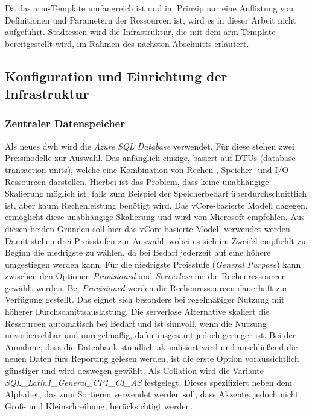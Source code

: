 Da das \ac{arm}-Template umfangreich ist und im Prinzip nur eine Auflistung von Definitionen und Parametern der Ressourcen ist, wird es in dieser Arbeit nicht aufgeführt. Stadtessen wird die Infrastruktur, die mit dem \ac{arm}-Template bereitgestellt wird, im Rahmen des nächsten Abschnitts erläutert.

\subsection{Konfiguration und Einrichtung der Infrastruktur} \label{subsec:infra:konfig}

\subsubsection{Zentraler Datenspeicher} \label{subsec:infra:konfig:datenspeicher}
Als neues \ac{dwh} wird die \textit{Azure SQL Database} verwendet. Für diese stehen zwei Preismodelle zur Auswahl. Das anfänglich einzige, basiert auf DTUs (database transaction units), welche eine Kombination von Rechen-, Speicher- und I/O Ressourcen darstellen. Hierbei ist das Problem, dass keine unabhängige Skalierung möglich ist, falls zum Beispiel der Speicherbedarf überdurchschnittlich ist, aber kaum Rechenleistung benötigt wird. Das vCore-basierte Modell dagegen, ermöglicht diese unabhängige Skalierung und wird von Microsoft empfohlen. Aus diesen beiden Gründen soll hier das vCore-basierte Modell verwendet werden. Damit stehen drei Preisstufen zur Auswahl, wobei es sich im Zweifel empfiehlt zu Beginn die niedrigste zu wählen, da bei Bedarf jederzeit auf eine höhere umgestiegen werden kann. Für die niedrigste Preisstufe (\textit{General Purpose}) kann zwischen den Optionen \textit{Provisioned} und \textit{Serverless} für die Rechenressourcen gewählt werden. Bei \textit{Provisioned} werden die Rechenressourcen dauerhaft zur Verfügung gestellt. Das eignet sich besonders bei regelmäßiger Nutzung mit höherer Durchschnittsauslastung. Die serverlose Alternative skaliert die Ressourcen automatisch bei Bedarf und ist sinnvoll, wenn die Nutzung unvorhersehbar und unregelmäßig, dafür insgesamt jedoch geringer ist. Bei der Annahme, dass die Datenbank stündlich aktualisiert wird und anschließend die neuen Daten fürs Reporting gelesen werden, ist die erste Option voraussichtlich günstiger und wird deswegen gewählt. Als Collation wird die Variante \textit{SQL{\_}Latin1{\_}General{\_}CP1{\_}CI{\_}AS} festgelegt. Dieses spezifiziert neben dem Alphabet, das zum Sortieren verwendet werden soll, dass Akzente, jedoch nicht Groß- und Kleinschreibung, berücksichtigt werden. \cite[vgl.][]{mauri_practical_2021}

